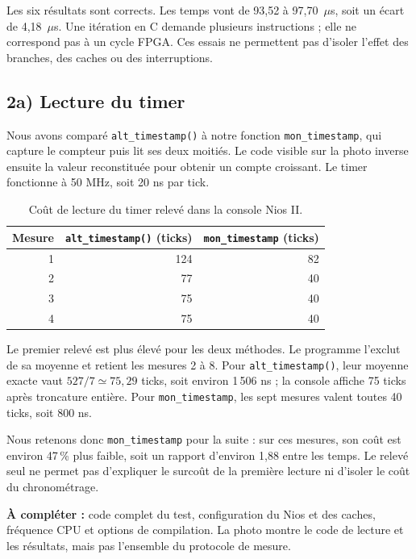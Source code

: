 \documentclass[a4paper,11pt]{article}
\begin{document}
Les six résultats sont corrects. Les temps vont de 93,52 à 97,70~$\mu$s, soit un écart de 4,18~$\mu$s. Une itération en C demande plusieurs instructions ; elle ne correspond pas à un cycle FPGA. Ces essais ne permettent pas d’isoler l’effet des branches, des caches ou des interruptions.

\clearpage
\subsection*{2a) Lecture du timer}
Nous avons comparé \texttt{alt\_timestamp()} à notre fonction \texttt{mon\_timestamp}, qui capture le compteur puis lit ses deux moitiés. Le code visible sur la photo inverse ensuite la valeur reconstituée pour obtenir un compte croissant. Le timer fonctionne à 50 MHz, soit 20 ns par tick.

\begin{table}[H]
\centering
\begin{tabular}{@{}rrr@{}}
\toprule
Mesure & \texttt{alt\_timestamp()} (ticks) & \texttt{mon\_timestamp} (ticks)\\
\midrule
1 & 124 & 82\\
2 & 77 & 40\\
3 & 75 & 40\\
4 & 75 & 40\\

\bottomrule
\end{tabular}
\caption{Coût de lecture du timer relevé dans la console Nios II.}
\end{table}

Le premier relevé est plus élevé pour les deux méthodes. Le programme l’exclut de sa moyenne et retient les mesures 2 à 8. Pour \texttt{alt\_timestamp()}, leur moyenne exacte vaut $527/7\simeq75{,}29$ ticks, soit environ 1\,506 ns ; la console affiche 75 ticks après troncature entière. Pour \texttt{mon\_timestamp}, les sept mesures valent toutes 40 ticks, soit 800 ns.

Nous retenons donc \texttt{mon\_timestamp} pour la suite : sur ces mesures, son coût est environ 47\,\% plus faible, soit un rapport d’environ 1,88 entre les temps. Le relevé seul ne permet pas d’expliquer le surcoût de la première lecture ni d’isoler le coût du chronométrage.

\textbf{À compléter :} code complet du test, configuration du Nios et des caches, fréquence CPU et options de compilation. La photo montre le code de lecture et les résultats, mais pas l’ensemble du protocole de mesure.
\end{document}

